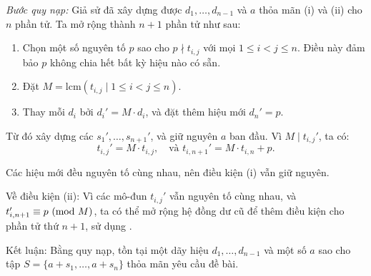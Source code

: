 \documentclass[../09-contruction-methods.tex]{subfiles}
\begin{document}
\begin{soln}
    \textit{Bước quy nạp:} Giả sử đã xây dựng được \( d_1, \dots, d_{n-1} \) và \( a \) thỏa mãn (i) và (ii) cho \( n \) phần tử. Ta mở rộng thành \( n+1 \) phần tử như sau:
    \begin{enumerate}[topsep=0pt, partopsep=0pt, itemsep=0pt, label=(\roman*)]
        \item Chọn một số nguyên tố \( p \) sao cho \( p \nmid t_{i,j} \) với mọi \( 1 \le i < j \le n \). Điều này đảm bảo \( p \) không chia hết bất kỳ hiệu nào có sẵn.
        \item Đặt \( M = \mathrm{lcm} \left( t_{i,j} \mid 1 \le i < j \le n \right) \).
        \item Thay mỗi \( d_i \) bởi \( d_i' = M \cdot d_i \), và đặt thêm hiệu mới \( d_n' = p \).
    \end{enumerate}
    
    Từ đó xây dựng các \( s_1', \dots, s_{n+1}' \), và giữ nguyên \( a \) ban đầu.  
    Vì \( M \mid t_{i,j}' \), ta có:
    \[
        t_{i,j}' = M \cdot t_{i,j}, \quad \text{và } t_{i,n+1}' = M \cdot t_{i,n} + p.
    \]
    
    Các hiệu mới đều nguyên tố cùng nhau, nên điều kiện (i) vẫn giữ nguyên.
    
    Về điều kiện (ii): Vì các mô-đun \( t_{i,j}' \) vẫn nguyên tố cùng nhau, và \( t_{i,n+1}' \equiv p \ (\mathrm{mod}\ M) \),
    ta có thể mở rộng hệ đồng dư cũ để thêm điều kiện cho phần tử thứ \( n+1 \), sử dụng .
    
    Kết luận: Bằng quy nạp, tồn tại một dãy hiệu \( d_1, \dots, d_{n-1} \) và một số \( a \) sao cho tập \( S = \{ a + s_1, \dots, a + s_n \} \) thỏa mãn yêu cầu đề bài.
\end{soln}

\end{document}
